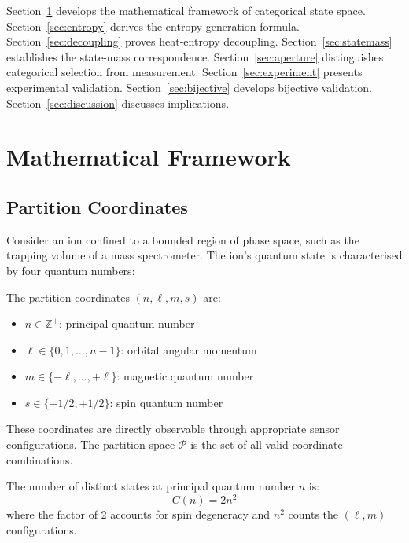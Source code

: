 Section~\ref{sec:framework} develops the mathematical framework of categorical state space. Section~\ref{sec:entropy} derives the entropy generation formula. Section~\ref{sec:decoupling} proves heat-entropy decoupling. Section~\ref{sec:statemass} establishes the state-mass correspondence. Section~\ref{sec:aperture} distinguishes categorical selection from measurement. Section~\ref{sec:experiment} presents experimental validation. Section~\ref{sec:bijective} develops bijective validation. Section~\ref{sec:discussion} discusses implications.

\section{Mathematical Framework}
\label{sec:framework}

\subsection{Partition Coordinates}

Consider an ion confined to a bounded region of phase space, such as the trapping volume of a mass spectrometer. The ion's quantum state is characterised by four quantum numbers:

\begin{definition}
\label{def:partition}
The partition coordinates $(n, \ell, m, s)$ are:
\begin{itemize}
    \item $n \in \mathbb{Z}^+$: principal quantum number
    \item $\ell \in \{0, 1, \ldots, n-1\}$: orbital angular momentum
    \item $m \in \{-\ell, \ldots, +\ell\}$: magnetic quantum number
    \item $s \in \{-1/2, +1/2\}$: spin quantum number
\end{itemize}
\end{definition}

These coordinates are directly observable through appropriate sensor configurations. The partition space $\mathcal{P}$ is the set of all valid coordinate combinations.

\begin{definition}
\label{def:capacity}
The number of distinct states at principal quantum number $n$ is:
\begin{equation}
    C(n) = 2n^2
\end{equation}
where the factor of 2 accounts for spin degeneracy and $n^2$ counts the $(\ell, m)$ configurations.
\end{definition}

